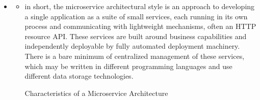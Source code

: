 \begin{itemize}
	\item \cite{MicroservicesMF}
	\begin{itemize}
		\item in short, the microservice architectural style is an approach to developing a single application as a suite of small services, each running in its own process and communicating with lightweight mechanisms, often an HTTP resource API. These services are built around business capabilities and independently deployable by fully automated deployment machinery. There is a bare minimum of centralized management of these services, which may be written in different programming languages and use different data storage technologies.
		
		Characteristics of a Microservice Architecture
		

\end{itemize}
\end{itemize}
